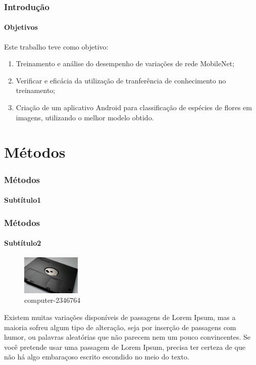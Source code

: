 \documentclass{beamer}
\begin{document}
    \begin{frame}
      \frametitle{Introdução}
      \framesubtitle{Objetivos}
      Este trabalho teve como objetivo:\medskip
      \begin{enumerate}        
        \item Treinamento e análise do desempenho de variações de rede MobileNet;        
        \medskip
        \item Verificar e eficácia da utilização de tranferência de conhecimento no treinamento;
        \medskip
        \item Criação de um aplicativo Android para classificação de espécies de flores em imagens, utilizando o melhor modelo obtido.
        \medskip
      \end{enumerate}
    \end{frame}
    
    \section{Métodos} %
    \begin{frame}
      \frametitle{Métodos}
      \framesubtitle{Subtítulo1}
      
			
	      
    \end{frame}
        
    \begin{frame}
      \frametitle{Métodos}
      \framesubtitle{Subtítulo2}
    
      \begin{figure}[htb]
        \begin{center}
          \caption{computer-2346764~\cite{computer-2346764}}
          \includegraphics[width=0.25\textwidth]{img/computer-2346764_1280.jpg}
        \end{center}
      \end{figure}
      \bigskip
      Existem muitas variações disponíveis de passagens de Lorem Ipsum, mas a maioria sofreu algum tipo de alteração, seja por inserção de passagens com humor, ou palavras aleatórias que não parecem nem um pouco convincentes. Se você pretende usar uma passagem de Lorem Ipsum, precisa ter certeza de que não há algo embaraçoso escrito escondido no meio do texto. 
    \end{frame}
    
\end{document}
